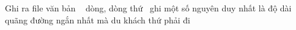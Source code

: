 Ghi ra file văn bản   dòng, dòng thứ  ghi một số nguyên duy nhất là độ dài quãng đường ngắn nhất mà du khách thứ phải đi